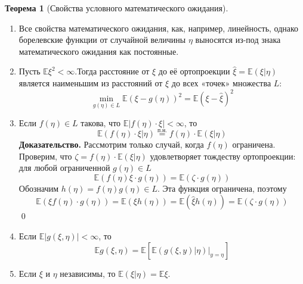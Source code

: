 \documentclass[oneside,final,14pt]{extreport}
\renewenvironment{proof}{{\bfseries Доказательство.}}{\qed}
\theoremstyle{plain}
\theoremstyle{definition}
\theoremstyle{named}
\newtheorem*{namedthm}{Теорема}
\begin{document}
\begin{namedthm}[Свойства условного математического ожидания]\leavevmode
    \begin{enumerate}
        \item Все свойства математического ожидания, как, например, линейность, однако борелевские функции от случайной величины $\eta$ выносятся из-под знака математического ожидания как постоянные.
        \item Пусть $\mathbb{E} \xi^{2}<\infty$.Тогда расстояние от $\xi$ до её ортопроекции $\widehat{\xi}=\mathbb{E}(\xi | \eta)$ является наименьшим из расстояний от $\xi$ до всех «точек» множества $L$:
        \begin{equation*}
            \min_{g(\eta) \in L} \mathbb{E}(\xi-g(\eta))^{2}=\mathbb{E}(\xi-\widehat{\xi})^{2}
        \end{equation*}
        \item Если $f(\eta) \in L$ такова, что $\mathbb{E}|f(\eta) \cdot \xi|<\infty$, то
        \begin{equation*}
            \mathbb{E}(f(\eta) \cdot \xi | \eta)
            \stackrel{\text{п.н.}}{=}
            f(\eta) \cdot \mathbb{E}(\xi | \eta)
        \end{equation*}
        \begin{proof}
            Рассмотрим только случай, когда $f(\eta)$ ограничена. Проверим, что $\zeta=f(\eta) \cdot \mathbb{E}(\xi | \eta)$ удовлетворяет тождеству ортопроекции: для любой ограниченной $g(\eta) \in L$
            \begin{equation*}
                \mathbb{E}(f(\eta) \xi \cdot g(\eta))=\mathbb{E}(\zeta \cdot g(\eta))
            \end{equation*}
            Обозначим $h(\eta)=f(\eta) g(\eta) \in L$. Эта функция ограничена, поэтому
            \begin{equation*}
                \mathbb{E}(\xi f(\eta) \cdot g(\eta))=\mathbb{E}(\xi h(\eta))=\mathbb{E}(\widehat{\xi} h(\eta))=\mathbb{E}(\zeta \cdot g(\eta))
            \end{equation*}
        \end{proof}
        \item Если $\mathbb{E}|g(\xi, \eta)|<\infty$, то
        \begin{equation*}
            \mathbb{E} g(\xi, \eta)=\mathbb{E}\left[\left.\mathbb{E}(g(\xi, y) | \eta)\right|_{y=\eta}\right]
        \end{equation*}
        \item Если $\xi$ и $\eta$ независимы, то $\mathbb{E}(\xi | \eta)=\mathbb{E} \xi$.
    \end{enumerate}
\end{namedthm}
\end{document}
